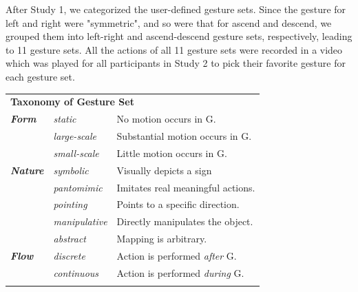 \documentclass{sigchi}
\newcommand\tabhead[1]{\small\textbf{#1}}
\begin{document}
After Study 1, we categorized the user-defined gesture sets. Since the gesture for left and right were "symmetric", and so were that for ascend and descend, we grouped them into left-right and ascend-descend gesture sets, respectively, leading to 11 gesture sets. All the actions of all 11 gesture sets were recorded in a video which was played for all participants in Study 2 to pick their favorite gesture for each gesture set.

\begin{table}
  \centering
  \begin{adjustwidth}{-0.4cm}{}
  \begin{tabular}{|l|l|l|}
    \hline
    \multicolumn{3}{|p{1.06\columnwidth}|}{\centering\tabhead{\textbf{Taxonomy of Gesture Set}}}\\
    \Xhline{4\arrayrulewidth}
    \textit{\textbf {Form}} &{\it static}& No motion occurs in G.\\ \cline{2-3}
    &{\it large-scale}& Substantial motion occurs in G. \\ \cline{2-3}
    &{\it small-scale}& Little motion occurs in G.\\
    \Xhline{4\arrayrulewidth}
    \textit{\textbf {Nature}} & {\it symbolic} &Visually depicts a sign \\ \cline{2-3}
    &{\it pantomimic}&Imitates real meaningful actions.\\ \cline{2-3}
    &{\it pointing}&Points to a specific direction.\\ \cline{2-3}
    &{\it manipulative}&Directly manipulates the object.\\ \cline{2-3}
    &{\it abstract}&Mapping is arbitrary.\\
    \Xhline{4\arrayrulewidth}
    \textit{\textbf {Flow}} & {\it discrete}&Action is performed {\it after} G.\\ \cline{2-3}
    &{\it continuous}&Action is performed {\it during} G.\\ 
    \Xhline{4\arrayrulewidth}

\end{tabular}
\end{adjustwidth}
\end{table}
\end{document}
